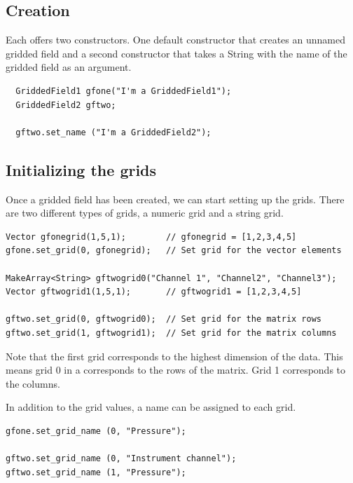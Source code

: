 \subsection{Creation}

Each  offers two constructors. One default constructor that creates an unnamed gridded field and a second constructor that takes a String with the name of the gridded field as an argument.

\begin{verbatim}
  GriddedField1 gfone("I'm a GriddedField1");
  GriddedField2 gftwo;
  
  gftwo.set_name ("I'm a GriddedField2");
\end{verbatim}


\subsection{Initializing the grids}

Once a gridded field has been created, we can start setting up the grids. There are two different types of grids, a numeric grid and a string grid.

\begin{verbatim}
Vector gfonegrid(1,5,1);        // gfonegrid = [1,2,3,4,5]
gfone.set_grid(0, gfonegrid);   // Set grid for the vector elements

MakeArray<String> gftwogrid0("Channel 1", "Channel2", "Channel3");
Vector gftwogrid1(1,5,1);       // gftwogrid1 = [1,2,3,4,5]

gftwo.set_grid(0, gftwogrid0);  // Set grid for the matrix rows
gftwo.set_grid(1, gftwogrid1);  // Set grid for the matrix columns
\end{verbatim}

Note that the first grid corresponds to the highest dimension of the data. This means grid 0 in a  corresponds to the rows of the matrix. Grid 1 corresponds to the columns.

In addition to the grid values, a name can be assigned to each grid.

\begin{verbatim}
gfone.set_grid_name (0, "Pressure");

gftwo.set_grid_name (0, "Instrument channel");
gftwo.set_grid_name (1, "Pressure");
\end{verbatim}

